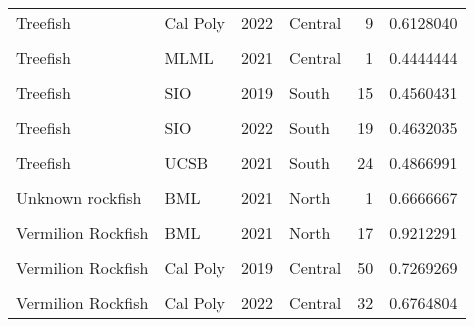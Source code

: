 \documentclass[
]{article}
\begin{document}
\begin{longtable}[t]{llrlrr}
Treefish & Cal Poly & 2022 & Central & 9 & 0.6128040\\
\addlinespace
\cellcolor{gray!6}{Treefish} & \cellcolor{gray!6}{MLML} & \cellcolor{gray!6}{2019} & \cellcolor{gray!6}{Central} & \cellcolor{gray!6}{4} & \cellcolor{gray!6}{0.4119875}\\
Treefish & MLML & 2021 & Central & 1 & 0.4444444\\
\cellcolor{gray!6}{Treefish} & \cellcolor{gray!6}{MLML} & \cellcolor{gray!6}{2022} & \cellcolor{gray!6}{Central} & \cellcolor{gray!6}{9} & \cellcolor{gray!6}{0.4898393}\\
Treefish & SIO & 2019 & South & 15 & 0.4560431\\
\cellcolor{gray!6}{Treefish} & \cellcolor{gray!6}{SIO} & \cellcolor{gray!6}{2021} & \cellcolor{gray!6}{South} & \cellcolor{gray!6}{3} & \cellcolor{gray!6}{0.6919192}\\
\addlinespace
Treefish & SIO & 2022 & South & 19 & 0.4632035\\
\cellcolor{gray!6}{Treefish} & \cellcolor{gray!6}{UCSB} & \cellcolor{gray!6}{2019} & \cellcolor{gray!6}{South} & \cellcolor{gray!6}{19} & \cellcolor{gray!6}{0.7521898}\\
Treefish & UCSB & 2021 & South & 24 & 0.4866991\\
\cellcolor{gray!6}{Treefish} & \cellcolor{gray!6}{UCSB} & \cellcolor{gray!6}{2022} & \cellcolor{gray!6}{South} & \cellcolor{gray!6}{37} & \cellcolor{gray!6}{0.5817959}\\
Unknown rockfish & BML & 2021 & North & 1 & 0.6666667\\
\addlinespace
\cellcolor{gray!6}{Vermilion Rockfish} & \cellcolor{gray!6}{BML} & \cellcolor{gray!6}{2019} & \cellcolor{gray!6}{North} & \cellcolor{gray!6}{28} & \cellcolor{gray!6}{1.1399823}\\
Vermilion Rockfish & BML & 2021 & North & 17 & 0.9212291\\
\cellcolor{gray!6}{Vermilion Rockfish} & \cellcolor{gray!6}{BML} & \cellcolor{gray!6}{2022} & \cellcolor{gray!6}{North} & \cellcolor{gray!6}{19} & \cellcolor{gray!6}{0.7731985}\\
Vermilion Rockfish & Cal Poly & 2019 & Central & 50 & 0.7269269\\
\cellcolor{gray!6}{Vermilion Rockfish} & \cellcolor{gray!6}{Cal Poly} & \cellcolor{gray!6}{2021} & \cellcolor{gray!6}{Central} & \cellcolor{gray!6}{27} & \cellcolor{gray!6}{0.9468120}\\
\addlinespace
Vermilion Rockfish & Cal Poly & 2022 & Central & 32 & 0.6764804\\

\end{longtable}
\end{document}
